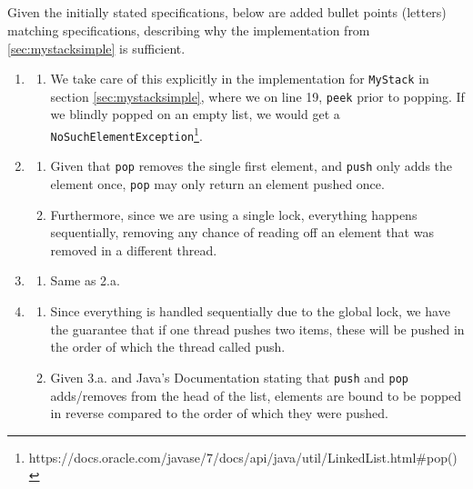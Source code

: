 \documentclass[a5paper]{article}
\begin{document}
\subsection{}
Given the initially stated  specifications, below are added bullet points (letters) matching specifications, describing why the implementation from \ref{sec:mystacksimple} is sufficient.
\begin{enumerate}

\item 
    \begin{enumerate}
        \item We take care of this explicitly in the implementation for \texttt{MyStack} in section \ref{sec:mystacksimple}, where we on line 19, \texttt{peek} prior to popping.
            If we blindly popped on an empty list, we would get a \texttt{NoSuchElementException}\footnote{https://docs.oracle.com/javase/7/docs/api/java/util/LinkedList.html\#pop()}.
    \end{enumerate}
\item
    \begin{enumerate}
        \item Given that \texttt{pop} removes the single first element, and \texttt{push} only adds the element once, \texttt{pop} may only return an element pushed once.
        \item Furthermore, since we are using a single lock, everything happens sequentially, removing any chance of reading off an element that was removed in a different thread.
    \end{enumerate}
\item
    \begin{enumerate}
        \item Same as 2.a.
    \end{enumerate}
\item 
    \begin{enumerate}
        \item Since everything is handled sequentially due to the global lock, we have the guarantee that if one thread pushes two items, these will be pushed
            in the order of which the thread called push. 
        \item Given 3.a. and Java's Documentation stating that \texttt{push} and \texttt{pop} adds/removes from the head of the list, elements are bound to be popped
            in reverse compared to the order of which they were pushed.
    \end{enumerate}
\end{enumerate}
\end{document}
